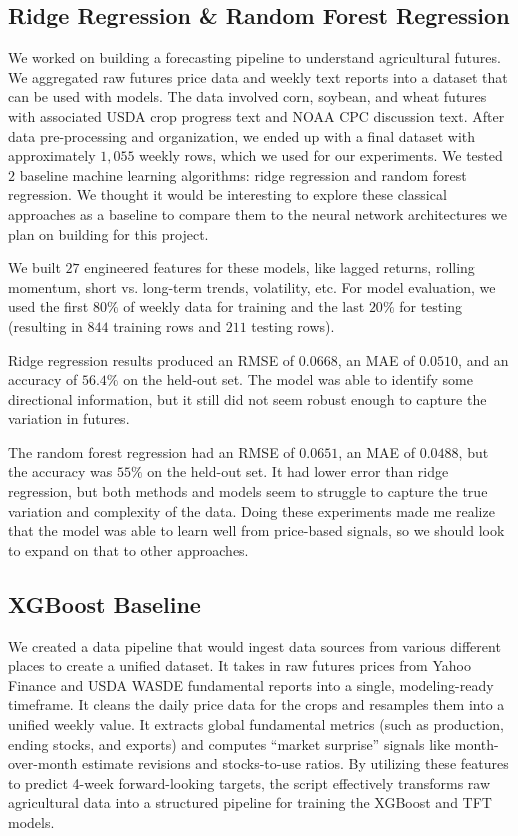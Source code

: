 \documentclass{article} %
\begin{document}
\subsection{Ridge Regression \& Random Forest Regression}
We worked on building a forecasting pipeline to understand agricultural futures. We aggregated raw futures price data and weekly text reports into a dataset that can be used with models. The data involved corn, soybean, and wheat futures with associated USDA crop progress text and NOAA CPC discussion text. After data pre-processing and organization, we ended up with a final dataset with approximately $1{,}055$ weekly rows, which we used for our experiments. We tested $2$ baseline machine learning algorithms: ridge regression and random forest regression. We thought it would be interesting to explore these classical approaches as a baseline to compare them to the neural network architectures we plan on building for this project. 

We built $27$ engineered features for these models, like lagged returns, rolling momentum, short vs. long-term trends, volatility, etc. For model evaluation, we used the first $80\%$ of weekly data for training and the last $20\%$ for testing (resulting in $844$ training rows and $211$ testing rows).

Ridge regression results produced an RMSE of $0.0668$, an MAE of $0.0510$, and an accuracy of $56.4\%$ on the held-out set. The model was able to identify some directional information, but it still did not seem robust enough to capture the variation in futures.

The random forest regression had an RMSE of $0.0651$, an MAE of $0.0488$, but the accuracy was $55\%$ on the held-out set. It had lower error than ridge regression, but both methods and models seem to struggle to capture the true variation and complexity of the data. Doing these experiments made me realize that the model was able to learn well from price-based signals, so we should look to expand on that to other approaches.

\subsection{XGBoost Baseline}

We created a data pipeline that would ingest data sources from various different places to create a unified dataset. It takes in raw futures prices from Yahoo Finance and USDA WASDE fundamental reports into a single, modeling-ready timeframe. It cleans the daily price data for the crops and resamples them into a unified weekly value. It extracts global fundamental metrics (such as production, ending stocks, and exports) and computes ``market surprise'' signals like month-over-month estimate revisions and stocks-to-use ratios. By utilizing these features to predict 4-week forward-looking targets, the script effectively transforms raw agricultural data into a structured pipeline for training the XGBoost and TFT models.
\end{document}
